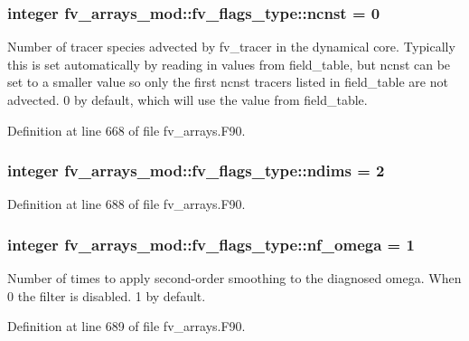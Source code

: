\subsubsection[{ncnst}]{\setlength{\rightskip}{0pt plus 5cm}integer fv\-\_\-arrays\-\_\-mod\-::fv\-\_\-flags\-\_\-type\-::ncnst = 0}\label{structfv__arrays__mod_1_1fv__flags__type_a24a73d24233252ae1710d6492b95889e}


Number of tracer species advected by fv\-\_\-tracer in the dynamical core. Typically this is set automatically by reading in values from field\-\_\-table, but ncnst can be set to a smaller value so only the first ncnst tracers listed in field\-\_\-table are not advected. 0 by default, which will use the value from field\-\_\-table. 



Definition at line 668 of file fv\-\_\-arrays.\-F90.

\subsubsection[{ndims}]{\setlength{\rightskip}{0pt plus 5cm}integer fv\-\_\-arrays\-\_\-mod\-::fv\-\_\-flags\-\_\-type\-::ndims = 2}\label{structfv__arrays__mod_1_1fv__flags__type_aeff1e1f69391e36b56e0927e5d6bc170}


Definition at line 688 of file fv\-\_\-arrays.\-F90.

\subsubsection[{nf\-\_\-omega}]{\setlength{\rightskip}{0pt plus 5cm}integer fv\-\_\-arrays\-\_\-mod\-::fv\-\_\-flags\-\_\-type\-::nf\-\_\-omega = 1}\label{structfv__arrays__mod_1_1fv__flags__type_abd162a3a59769c31fc81069d02e788ed}


Number of times to apply second-\/order smoothing to the diagnosed omega. When 0 the filter is disabled. 1 by default. 



Definition at line 689 of file fv\-\_\-arrays.\-F90.

